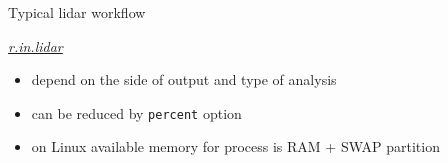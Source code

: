 \documentclass[xcolor={dvipsnames,usenames},beamer,aspectratio=169]{beamer}
\newcommand{\gmodule}[1]{\href{http://grass.osgeo.org/grass71/manuals/#1.html}{\emph{#1}}}
\begin{document}
\begin{frame}{Typical lidar workflow}

\begin{block}{\gmodule{r.in.lidar}}
 \begin{itemize}
  \item depend on the side of output and type of analysis
  \item can be reduced by \texttt{percent} option
  \item on Linux available memory for process is RAM + SWAP partition
 \end{itemize}
\end{block}


\end{frame}
\end{document}

